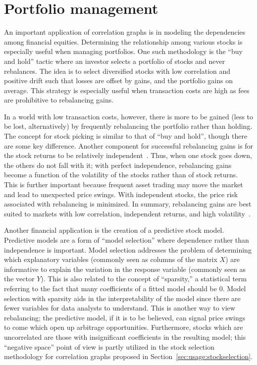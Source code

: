 \section{Portfolio management}
\label{sec:intro:finance}

An important application of correlation graphs is in modeling the dependencies 
among financial equities. Determining the relationship among various stocks is 
especially useful when managing portfolios. One such methodology is the ``buy 
and hold'' tactic where an investor selects a portfolio of stocks and never 
rebalances. The idea is to select diversified stocks with low correlation and 
positive drift such that losses are offset by gains, and the portfolio gains on 
average. This strategy is especially useful when transaction costs are high as 
fees are prohibitive to rebalancing gains. 

In a world with low transaction costs, however, there is more to be gained 
(less to be lost, alternatively) by frequently rebalancing the portfolio rather 
than holding. The concept for stock picking is similar to that of ``buy and 
hold'', though there are some key difference. Another component for successful 
rebalancing gains is for the stock returns to be relatively 
independent~\cite{liuh2016}. Thus, when one stock goes down, the others do not 
fall with it; with perfect independence, rebalancing gains become a function of 
the volatility of the stocks rather than of stock returns. This is further 
important because frequent asset trading may move the market and lead to 
unexpected price swings. With independent stocks, the price risk associated 
with rebalancing is minimized. In summary, rebalancing gains are best suited to 
markets with low correlation, independent returns, and high 
volatility~\cite{liuh2016}.  

Another financial application is the creation of a predictive stock model. 
Predictive models are a form of ``model selection'' where dependence rather 
than independence is important. Model selection addresses the problem of 
determining which explanatory variables (commonly seen as columns of the matrix 
$X$) are informative to explain the variation in the response variable 
(commonly seen as the vector $Y$). This is also related to the concept of 
``sparsity,'' a statistical term referring to the fact that many coefficients 
of a fitted model should be 0. Model selection with sparsity aids in the 
interpretability of the model since there are fewer variables for data analysts 
to understand. This is another way to view rebalancing; the predictive model, 
if it is to be believed, can signal price swings to come which open up 
arbitrage opportunities. Furthermore, stocks which are uncorrelated are those 
with insignificant coefficients in the resulting model; this ``negative space'' 
point of view is partly utilized in the stock selection methodology for 
correlation graphs proposed in  Section~\ref{sec:usage:stockselection}.


